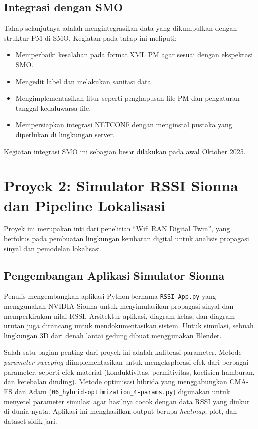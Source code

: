 \subsection{Integrasi dengan SMO}
Tahap selanjutnya adalah mengintegrasikan data yang dikumpulkan dengan struktur PM di SMO. Kegiatan pada tahap ini meliputi:
\begin{itemize}
    \item Memperbaiki kesalahan pada format XML PM agar sesuai dengan ekspektasi SMO.
    \item Mengedit label dan melakukan sanitasi data.
    \item Mengimplementasikan fitur seperti penghapusan file PM dan pengaturan tanggal kedaluwarsa file.
    \item Mempersiapkan integrasi NETCONF dengan menginstal pustaka yang diperlukan di lingkungan server.
\end{itemize}
Kegiatan integrasi SMO ini sebagian besar dilakukan pada awal Oktober 2025.

\section{Proyek 2: Simulator RSSI Sionna dan Pipeline Lokalisasi}
Proyek ini merupakan inti dari penelitian ``Wifi RAN Digital Twin'', yang berfokus pada pembuatan lingkungan kembaran digital untuk analisis propagasi sinyal dan pemodelan lokalisasi.

\subsection{Pengembangan Aplikasi Simulator Sionna}
Penulis mengembangkan aplikasi Python bernama \texttt{RSSI\_App.py} yang menggunakan NVIDIA Sionna untuk menyimulasikan propagasi sinyal dan memperkirakan nilai RSSI. Arsitektur aplikasi, diagram kelas, dan diagram urutan juga dirancang untuk mendokumentasikan sistem. Untuk simulasi, sebuah lingkungan 3D dari denah lantai gedung dibuat menggunakan Blender.

Salah satu bagian penting dari proyek ini adalah kalibrasi parameter. Metode \textit{parameter sweeping} diimplementasikan untuk mengeksplorasi efek dari berbagai parameter, seperti efek material (konduktivitas, permitivitas, koefisien hamburan, dan ketebalan dinding). Metode optimisasi hibrida yang menggabungkan CMA-ES dan Adam (\texttt{06\_hybrid-optimization\_4-params.py}) digunakan untuk menyetel parameter simulasi agar hasilnya cocok dengan data RSSI yang diukur di dunia nyata. Aplikasi ini menghasilkan output berupa \textit{heatmap}, plot, dan dataset sidik jari.

